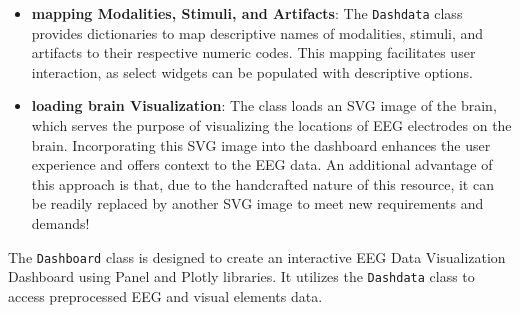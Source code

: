 \documentclass[format=sigconf]{acmart}
\begin{document}
\begin{itemize}
				\item{\textbf{mapping Modalities, Stimuli, and Artifacts}}: The \texttt{Dashdata} class provides dictionaries to map descriptive names of modalities, stimuli, and artifacts to their respective numeric codes. This mapping facilitates user interaction, as select widgets can be populated with descriptive options.
				
				
				
				\item{\textbf{loading brain Visualization}}: The class loads an SVG image of the brain, which serves the purpose of visualizing the locations of EEG electrodes on the brain. Incorporating this SVG image into the dashboard enhances the user experience and offers context to the EEG data. An additional advantage of this approach is that, due to the handcrafted nature of this resource, it can be readily replaced by another SVG image to meet new requirements and demands!
				
				
			\end{itemize}
			
			\par The \texttt{Dashboard} class is designed to create an interactive EEG Data Visualization Dashboard using Panel and Plotly libraries. It utilizes the \texttt{Dashdata} class to access preprocessed EEG and visual elements data.
			
\end{document}
